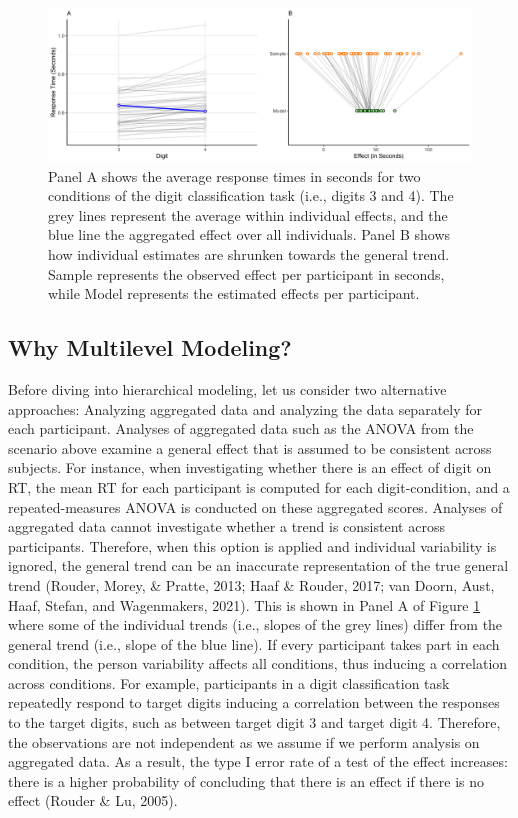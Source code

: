 \documentclass[
  english,
  doc,floatsintext]{apa6}
\begin{document}
\begin{figure}[H]

\includegraphics[width=0.95\linewidth]{Images/Fig1_meanrtandhierplot_v2} \hfill{}

\caption{Panel A shows the average response times in seconds for two conditions of the digit classification task (i.e., digits 3 and 4). The grey lines represent the average within individual effects, and the blue line the aggregated effect over all individuals. Panel B shows how individual estimates are shrunken towards the general trend. Sample represents the observed effect per participant in seconds, while Model represents the estimated effects per participant. }\label{fig:figure1}
\end{figure}

\hypertarget{why-multilevel-modeling}{%
\subsection{Why Multilevel Modeling?}\label{why-multilevel-modeling}}

Before diving into hierarchical modeling, let us consider two alternative approaches: Analyzing aggregated data and analyzing the data separately for each participant. Analyses of aggregated data such as the ANOVA from the scenario above examine a general effect that is assumed to be consistent across subjects. For instance, when investigating whether there is an effect of digit on RT, the mean RT for each participant is computed for each digit-condition, and a repeated-measures ANOVA is conducted on these aggregated scores. Analyses of aggregated data cannot investigate whether a trend is consistent across participants. Therefore, when this option is applied and individual variability is ignored, the general trend can be an inaccurate representation of the true general trend (Rouder, Morey, \& Pratte, 2013; Haaf \& Rouder, 2017; van Doorn, Aust, Haaf, Stefan, and Wagenmakers, 2021). This is shown in Panel A of Figure \ref{fig:figure1} where some of the individual trends (i.e., slopes of the grey lines) differ from the general trend (i.e., slope of the blue line). If every participant takes part in each condition, the person variability affects all conditions, thus inducing a correlation across conditions. For example, participants in a digit classification task repeatedly respond to target digits inducing a correlation between the responses to the target digits, such as between target digit 3 and target digit 4. Therefore, the observations are not independent as we assume if we perform analysis on aggregated data. As a result, the type I error rate of a test of the effect increases: there is a higher probability of concluding that there is an effect if there is no effect (Rouder \& Lu, 2005).
\end{document}
